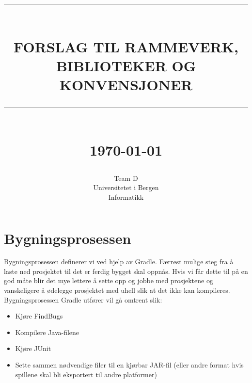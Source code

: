 \documentclass[12pt]{report}
\newcommand{\HRule}[1]{\rule{\linewidth}{#1}}
\begin{document}
\title{ \normalsize \textsc{}
		\\ [2.0cm]
		\HRule{0.5pt} \\
		\LARGE \textbf{\uppercase{Forslag til rammeverk,
		biblioteker og konvensjoner}}
		\HRule{2pt} \\ [0.5cm]
		\normalsize \today \vspace*{5\baselineskip}}

\date{}

\author{
		Team D \\ 
		Universitetet i Bergen \\
		Informatikk }

\maketitle
\tableofcontents
\newpage



\section*{Bygningsprosessen}

Bygningsprosessen definerer vi ved hjelp av Gradle. F{\ae}rrest mulige steg fra {\aa} laste ned prosjektet til det er
ferdig bygget skal oppn{\aa}s. Hvis vi f{\aa}r dette til p{\aa} en god m{\aa}te blir det mye lettere {\aa} sette opp og
jobbe med prosjektene og vanskeligere {\aa} {\o}delegge prosjektet med uhell slik at det ikke kan kompileres.\\

Bygningsprosessen Gradle utf{\o}rer vil g{\aa} omtrent slik:

\begin{itemize}
\item Kj{\o}re FindBugs
\item Kompilere Java-filene
\item Kj{\o}re JUnit
\item Sette sammen n{\o}dvendige filer til en kj{\o}rbar JAR-fil (eller andre format hvis spillene skal bli eksportert
til andre platformer)
\end{itemize}
\end{document}
